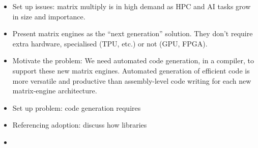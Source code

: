 \documentclass[\main/thesis.tex]{subfiles}
\begin{document}

\begin{itemize}
  \item
    Set up issues: matrix multiply is in high demand as HPC and AI tasks grow in size and importance.
  \item
    Present matrix engines as the ``next generation'' solution.
    They don't require extra hardware, specialised (TPU, etc.) or not (GPU, FPGA).
  \item
    Motivate the problem: We need automated code generation, in a compiler, to support these new matrix engines.
    Automated generation of efficient code is more versatile and productive than assembly-level code writing for each new matrix-engine architecture.
  \item
    Set up problem: code generation requires
  \item
    Referencing adoption: discuss how libraries
  \item

\end{itemize}
\end{document}
